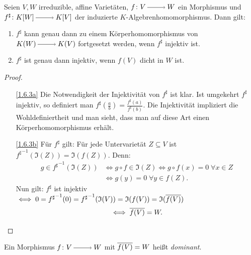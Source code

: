 \documentclass[a4paper,12pt,index=toc]{scrbook}
\theoremstyle{keinenummern} %
\def\I{\mathfrak{I}}
\def\Bar#1{\ensuremath\overline{#1}}
\begin{document}
\begin{prop}\label{1.6.3}
Seien $V,W$ irreduzible, affine Varietäten, $f \colon V\ra W$ ein Morphismus und $f^{\sharp} \colon K[W]\ra K[V]$ der induzierte $K$-Algebrenhomomorphismus. Dann gilt:
  \begin{enumerate}
  \item{} $f^{\sharp}$ kann genau dann zu einem Körperhomomorphismus von $K(W)\ra K(V)$ fortgesetzt werden, wenn $f^{\sharp}$ injektiv ist.
  \item{} $f^{\sharp}$ ist genau dann injektiv, wenn $f(V)$ dicht in $W$ ist.
  \end{enumerate}
\end{prop}

\begin{proof}
  \begin{enumerate}
  \item[\ref{1.6.3a}] Die Notwendigkeit der Injektivität von $f^{\sharp}$ ist klar. Ist umgekehrt $f^{\sharp}$ injektiv, so definiert man $f^{\sharp}(\frac{a}{b})=\frac{f^{\sharp}(a)}{f^{\sharp}(b)}$. Die Injektivität impliziert die Wohldefiniertheit und man sieht, dass man auf diese Art einen     Körperhomomorphismus erhält.
  \item[\ref{1.6.3b}]  Für $f^{\sharp}$ gilt: Für jede Untervarietät $Z \subseteq V$ ist ${f^{\sharp}}^{-1}(\I(Z))=\I(f(Z))$. Denn:
\begin{align*}g \in {f^{\sharp}}^{-1}(\I(Z))& \iff g\circ f \in \I(Z) \iff g \circ f(x)=0 \;\forall x \in Z\\
& \iff g(y)=0 \;\forall y \in f(Z).\end{align*}
Nun gilt: $f^{\sharp}$ ist injektiv $\iff 0={f^{\sharp}}^{-1}(0)={f^{\sharp}}^{-1}(\I(V))=\I(f(V))=\I(\Bar{f(V)})$
\[ \iff \Bar{f(V)}=W.\]  
  \end{enumerate}
\end{proof}

\begin{dfn}\label{1.6.4}
Ein Morphismus $f \colon V\ra W$ mit $\Bar{f(V)}=W$ heißt \emph{dominant}.
\end{dfn}
\end{document}

